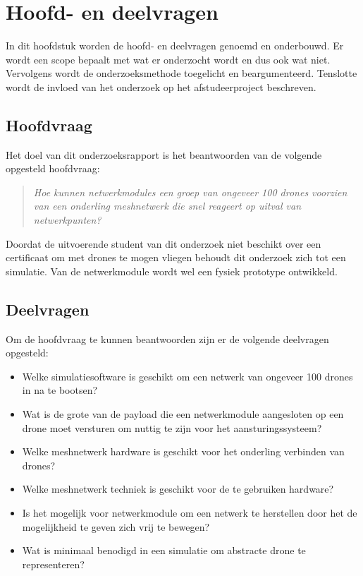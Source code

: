 \documentclass[a4paper, 11pt, oneside]{report}
\begin{document}
\chapter{Hoofd- en deelvragen}
In dit hoofdstuk worden de hoofd- en deelvragen genoemd en onderbouwd.
Er wordt een scope bepaalt met wat er onderzocht wordt en dus ook wat niet.
Vervolgens wordt de onderzoeksmethode toegelicht en beargumenteerd.
Tenslotte wordt de invloed van het onderzoek op het afstudeerproject beschreven.

\section{Hoofdvraag}
Het doel van dit onderzoeksrapport is het beantwoorden van de volgende opgesteld hoofdvraag:
\begin{quotation}
\textit{Hoe kunnen netwerkmodules een groep van ongeveer 100 drones voorzien van een onderling meshnetwerk die snel reageert op uitval van netwerkpunten?}	
\end{quotation}
Doordat de uitvoerende student van dit onderzoek niet beschikt over een certificaat om met drones te mogen vliegen behoudt dit onderzoek zich tot een simulatie.
Van de netwerkmodule wordt wel een fysiek prototype ontwikkeld.

\section{Deelvragen}

Om de hoofdvraag te kunnen beantwoorden zijn er de volgende deelvragen opgesteld:

\begin{itemize}
	\item Welke simulatiesoftware is geschikt om een netwerk van ongeveer 100 drones in na te bootsen?
	\item Wat is de grote van de payload die een netwerkmodule aangesloten op een drone moet versturen om nuttig te zijn voor het aansturingssysteem?
	\item Welke meshnetwerk hardware is geschikt voor het onderling verbinden van drones?
	\item Welke meshnetwerk techniek is geschikt voor de te gebruiken hardware?
	\item Is het mogelijk voor netwerkmodule om een netwerk te herstellen door het de mogelijkheid te geven zich vrij te bewegen?
	\item Wat is minimaal benodigd in een simulatie om abstracte drone te representeren?
\end{itemize}
\end{document}
